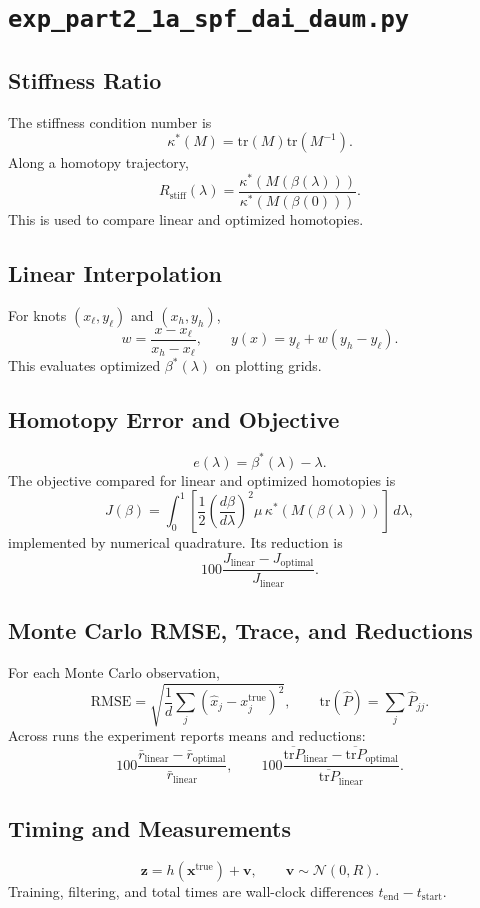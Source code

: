 \documentclass[11pt]{article}
\newcommand{\code}[1]{\texttt{#1}}
\newcommand{\tr}{\mathrm{tr}}
\newcommand{\RMSE}{\mathrm{RMSE}}
\begin{document}
\section{\code{exp\_part2\_1a\_spf\_dai\_daum.py}}
\subsection*{Stiffness Ratio}
The stiffness condition number is
\[
\kappa^*(M)=\tr(M)\tr(M^{-1}).
\]
Along a homotopy trajectory,
\[
R_{\mathrm{stiff}}(\lambda)=\frac{\kappa^*(M(\beta(\lambda)))}{\kappa^*(M(\beta(0)))}.
\]
This is used to compare linear and optimized homotopies.

\subsection*{Linear Interpolation}
For knots \((x_\ell,y_\ell)\) and \((x_h,y_h)\),
\[
w=\frac{x-x_\ell}{x_h-x_\ell},\qquad
y(x)=y_\ell+w(y_h-y_\ell).
\]
This evaluates optimized \(\beta^*(\lambda)\) on plotting grids.

\subsection*{Homotopy Error and Objective}
\[
e(\lambda)=\beta^*(\lambda)-\lambda.
\]
The objective compared for linear and optimized homotopies is
\[
J(\beta)=\int_0^1
\left[
\frac12\left(\frac{d\beta}{d\lambda}\right)^2
\mu\,\kappa^*(M(\beta(\lambda)))
\right]\,d\lambda,
\]
implemented by numerical quadrature. Its reduction is
\[
100\frac{J_{\mathrm{linear}}-J_{\mathrm{optimal}}}{J_{\mathrm{linear}}}.
\]

\subsection*{Monte Carlo RMSE, Trace, and Reductions}
For each Monte Carlo observation,
\[
\RMSE=\sqrt{\frac{1}{d}\sum_j(\hat x_j-x^{\mathrm{true}}_j)^2},\qquad
\tr(\hat P)=\sum_j\hat P_{jj}.
\]
Across runs the experiment reports means and reductions:
\[
100\frac{\bar r_{\mathrm{linear}}-\bar r_{\mathrm{optimal}}}{\bar r_{\mathrm{linear}}},
\qquad
100\frac{\overline{\tr P}_{\mathrm{linear}}-\overline{\tr P}_{\mathrm{optimal}}}{\overline{\tr P}_{\mathrm{linear}}}.
\]

\subsection*{Timing and Measurements}
\[
\bm z=h(\bm x^{\mathrm{true}})+\bm v,\qquad \bm v\sim\mathcal N(0,R).
\]
Training, filtering, and total times are wall-clock differences \(t_{\mathrm{end}}-t_{\mathrm{start}}\).
\end{document}
